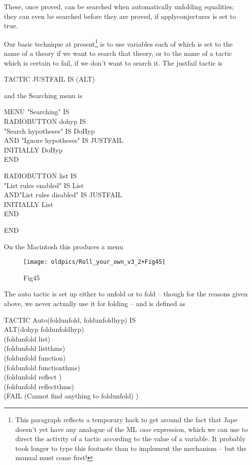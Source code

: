 \documentclass[11pt]{book}
\newcommand{\tab}{\hspace{5mm}}
\begin{document}
These, once proved, can be searched when automatically unfolding equalities; they can even be searched before they are proved, if applyconjectures is set to true.


Our basic technique at present\footnote{This paragraph reflects a temporary hack to get around the fact that Jape doesn't yet have any analogue of the ML \textit{case} expression, which we can use to direct the activity of a tactic according to the value of a variable. It probably took longer to type this footnote than to implement the mechanism -- but the manual must come first!} is to use variables each of which is set to the name of a theory if we want to search that theory, or to the name of a tactic which is certain to fail, if we don't want to search it. The justfail tactic is

TACTIC JUSTFAIL IS (ALT)


and the Searching menu is

MENU "Searching" IS\\
\tab RADIOBUTTON dohyp IS \\
\tab "Search hypotheses" IS DoHyp\\
\tab AND "Ignore hypotheses" IS JUSTFAIL\\
\tab INITIALLY DoHyp\\
\tab END

\tab RADIOBUTTON list IS \\
\tab "List rules enabled" IS List\\
\tab AND\tab  "List rules disabled" IS JUSTFAIL\\
\tab INITIALLY List\\
\tab END

\tab  END


On the Macintosh this produces a menu

\begin{figure}[htbp] \begin{center} \texttt{[image: oldpics/Roll\_your\_own\_v3\_2+Fig45]} \caption{Fig45} \end{center} \end{figure}


The auto tactic is set up either to unfold or to fold -- though for the reasons given above, we never actually use it for folding -- and is defined as

TACTIC Auto(foldunfold, foldunfoldhyp) IS \\
ALT\tab (dohyp foldunfoldhyp)\\
\tab (foldunfold list) \\
\tab (foldunfold listthms) \\
\tab (foldunfold function) \\
\tab (foldunfold functionthms) \\
\tab (foldunfold reflect ) \\
\tab (foldunfold reflectthms)\\
\tab (FAIL (Cannot find anything to foldunfold) )
\end{document}
